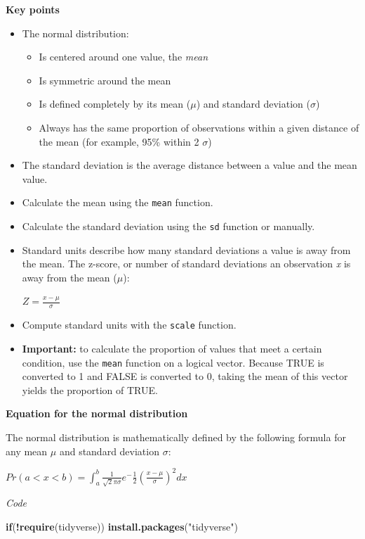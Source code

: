 \documentclass[
]{article}
\newenvironment{Shaded}{\begin{snugshade}}{\end{snugshade}}
\newcommand{\ControlFlowTok}[1]{\textcolor[rgb]{0.13,0.29,0.53}{\textbf{#1}}}
\newcommand{\KeywordTok}[1]{\textcolor[rgb]{0.13,0.29,0.53}{\textbf{#1}}}
\newcommand{\NormalTok}[1]{#1}
\newcommand{\OperatorTok}[1]{\textcolor[rgb]{0.81,0.36,0.00}{\textbf{#1}}}
\newcommand{\StringTok}[1]{\textcolor[rgb]{0.31,0.60,0.02}{#1}}
\providecommand{\tightlist}{%
  \setlength{\itemsep}{0pt}\setlength{\parskip}{0pt}}
\begin{document}
\textbf{Key points}

\begin{itemize}
\item
  The normal distribution:

  \begin{itemize}
  \tightlist
  \item
    Is centered around one value, the \emph{mean}
  \item
    Is symmetric around the mean
  \item
    Is defined completely by its mean (\(\mu\)) and standard deviation
    (\(\sigma\))
  \item
    Always has the same proportion of observations within a given
    distance of the mean (for example, 95\% within 2 \(\sigma\))
  \end{itemize}
\item
  The standard deviation is the average distance between a value and the
  mean value.
\item
  Calculate the mean using the \texttt{mean} function.
\item
  Calculate the standard deviation using the \texttt{sd} function or
  manually.
\item
  Standard units describe how many standard deviations a value is away
  from the mean. The z-score, or number of standard deviations an
  observation \emph{x} is away from the mean (\(\mu\)):

  \(Z = \frac{x - \mu}{\sigma}\)
\item
  Compute standard units with the \texttt{scale} function.
\item
  \textbf{Important:} to calculate the proportion of values that meet a
  certain condition, use the \texttt{mean} function on a logical vector.
  Because TRUE is converted to 1 and FALSE is converted to 0, taking the
  mean of this vector yields the proportion of TRUE.
\end{itemize}

\textbf{Equation for the normal distribution}

The normal distribution is mathematically defined by the following
formula for any mean \(\mu\) and standard deviation \(\sigma\):

\(Pr(a < x < b) = \int_{a}^{b} \frac{1}{\sqrt2\pi\sigma} e^-\frac{1}{2}(\frac{x - \mu}{\sigma})^2 dx\)

\emph{Code}

\begin{Shaded}
\begin{Highlighting}[]
\ControlFlowTok{if}\NormalTok{(}\OperatorTok{!}\KeywordTok{require}\NormalTok{(tidyverse)) }\KeywordTok{install.packages}\NormalTok{(}\StringTok{"tidyverse"}\NormalTok{)}
\end{Highlighting}
\end{Shaded}
\end{document}
